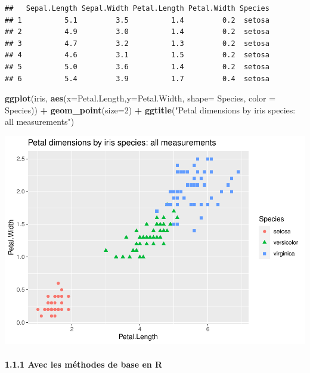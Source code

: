 \documentclass[
]{article}
\newenvironment{Shaded}{\begin{snugshade}}{\end{snugshade}}
\newcommand{\DataTypeTok}[1]{\textcolor[rgb]{0.13,0.29,0.53}{#1}}
\newcommand{\DecValTok}[1]{\textcolor[rgb]{0.00,0.00,0.81}{#1}}
\newcommand{\KeywordTok}[1]{\textcolor[rgb]{0.13,0.29,0.53}{\textbf{#1}}}
\newcommand{\NormalTok}[1]{#1}
\newcommand{\OperatorTok}[1]{\textcolor[rgb]{0.81,0.36,0.00}{\textbf{#1}}}
\newcommand{\StringTok}[1]{\textcolor[rgb]{0.31,0.60,0.02}{#1}}
\begin{document}
\begin{verbatim}
##   Sepal.Length Sepal.Width Petal.Length Petal.Width Species
## 1          5.1         3.5          1.4         0.2  setosa
## 2          4.9         3.0          1.4         0.2  setosa
## 3          4.7         3.2          1.3         0.2  setosa
## 4          4.6         3.1          1.5         0.2  setosa
## 5          5.0         3.6          1.4         0.2  setosa
## 6          5.4         3.9          1.7         0.4  setosa
\end{verbatim}

\begin{Shaded}
\begin{Highlighting}[]
\KeywordTok{ggplot}\NormalTok{(iris, }\KeywordTok{aes}\NormalTok{(}\DataTypeTok{x=}\NormalTok{Petal.Length,}\DataTypeTok{y=}\NormalTok{Petal.Width,}
                 \DataTypeTok{shape=}\NormalTok{ Species, }\DataTypeTok{color =}\NormalTok{ Species)) }\OperatorTok{+}
\StringTok{    }\KeywordTok{geom_point}\NormalTok{(}\DataTypeTok{size=}\DecValTok{2}\NormalTok{) }\OperatorTok{+}
\StringTok{    }\KeywordTok{ggtitle}\NormalTok{(}\StringTok{"Petal dimensions by iris species: all measurements"}\NormalTok{)}
\end{Highlighting}
\end{Shaded}

\includegraphics{5_Data_engineering_and_shaping_files/figure-latex/1.1-1.pdf}

\hypertarget{avec-les-muxe9thodes-de-base-en-r}{%
\paragraph{1.1.1 Avec les méthodes de base en
R}\label{avec-les-muxe9thodes-de-base-en-r}}
\end{document}
